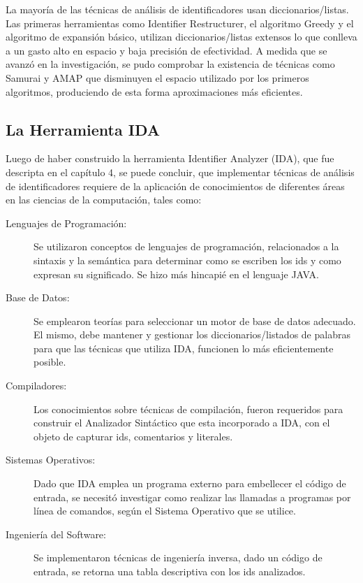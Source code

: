 La mayoría de las técnicas de análisis de identificadores usan diccionarios/listas. Las primeras herramientas como Identifier Restructurer, el algoritmo Greedy y el algoritmo de expansión básico, utilizan diccionarios/listas extensos lo que conlleva a un gasto alto en espacio y baja precisión de efectividad. A medida que se avanzó en la investigación, se pudo comprobar la existencia de técnicas como Samurai y AMAP que disminuyen el espacio utilizado por los primeros algoritmos, produciendo de esta forma aproximaciones más eficientes.

\subsection{La Herramienta IDA}

Luego de haber construido la herramienta Identifier Analyzer (IDA), que fue descripta en el capítulo 4, se puede concluir, que implementar técnicas de análisis de identificadores requiere de la aplicación de conocimientos de diferentes áreas en las ciencias de la computación, tales como:

\begin{description}

\item[Lenguajes de Programación:] Se utilizaron conceptos de lenguajes de programación, relacionados a la sintaxis y la semántica para determinar como se escriben los ids y como expresan su significado. Se  hizo más hincapié en el lenguaje JAVA.

\item[Base de Datos:] Se emplearon teorías para seleccionar un motor de base de datos adecuado. El mismo, debe mantener y gestionar los diccionarios/listados de palabras para que las técnicas que utiliza IDA, funcionen lo más eficientemente posible.

\item[Compiladores:] Los conocimientos sobre técnicas de compilación, fueron requeridos para construir el Analizador Sintáctico que esta incorporado a IDA, con el objeto de capturar ids, comentarios y literales. 

\item[Sistemas Operativos:] Dado que IDA emplea un programa externo para embellecer el código de entrada, se necesitó investigar como realizar las llamadas a programas por línea de comandos, según el Sistema Operativo que se utilice.

\item[Ingeniería del Software:] Se implementaron técnicas de ingeniería inversa, dado un código de entrada, se retorna una tabla descriptiva con los ids analizados.

\end{description}

